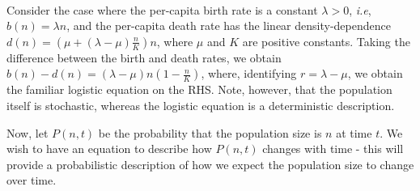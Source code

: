 \\
\begin{example}\label{ex_1D_stoch_logistic}
Consider the case where the per-capita birth rate is a constant $\lambda > 0$, \emph{i.e}, $b(n) = \lambda n$, and the per-capita death rate has the linear density-dependence $d(n) = \left(\mu + (\lambda-\mu)\frac{n}{K}\right)n$, where $\mu$ and $K$ are positive constants. Taking the difference between the birth and death rates, we obtain $b(n) - d(n) = (\lambda - \mu)n\left(1-\frac{n}{K}\right)$, where, identifying $r=\lambda-\mu$, we obtain the familiar logistic equation on the RHS. Note, however, that the population itself is stochastic, whereas the logistic equation is a deterministic description.
\end{example}
Now, let $P(n,t)$ be the probability that the population size is $n$ at time $t$. We wish to have an equation to describe how $P(n,t)$ changes with time - this will provide a probabilistic description of how we expect the population size to change over time.

